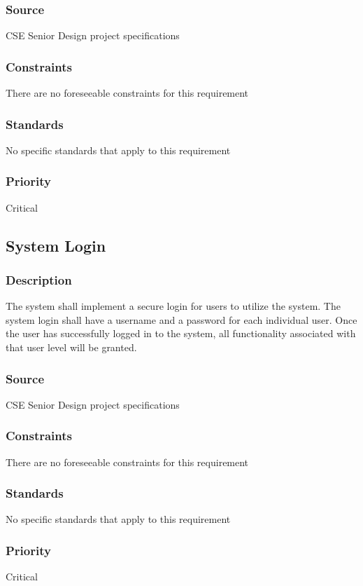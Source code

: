 \subsubsection{Source}
\quad \quad CSE Senior Design project specifications
\subsubsection{Constraints}
\quad \quad There are no foreseeable constraints for this requirement  
\subsubsection{Standards}
\quad \quad No specific standards that apply to this requirement
\subsubsection{Priority}
\quad \quad Critical

\subsection{System Login}
\subsubsection{Description}
\quad \quad The system shall implement a secure login for users to utilize the system. The 
system login shall have a username and a password for each individual user. Once the 
user has successfully logged in to the system, all functionality associated with 
that user level will be granted.
\subsubsection{Source}
\quad \quad CSE Senior Design project specifications
\subsubsection{Constraints}
\quad \quad There are no foreseeable constraints for this requirement  
\subsubsection{Standards}
\quad \quad No specific standards that apply to this requirement
\subsubsection{Priority}
\quad \quad Critical

